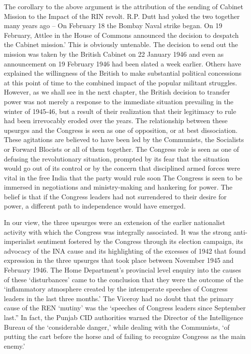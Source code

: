 The corollary to the above argument is the attribution of the sending of Cabinet Mission to the Impact of the RIN revolt. R.P. Dutt had yoked the two together many years ago – On February 18 the Bombay Naval strike began. On 19 February, Attlee in the House of Commons announced the decision to despatch the Cabinet mission.’ This is obviously untenable. The decision to send out the mission was taken by the British Cabinet on 22 January 1946 and even as announcement on 19 February 1946 had been slated a week earlier. Others have explained the willingness of the British to make substantial political concessions at this point of time to the combined impact of the popular militant struggles. However, as we shall see in the next chapter, the British decision to transfer power was not merely a response to the immediate situation prevailing in the winter of 1945-46, but a result of their realization that their legitimacy to rule had been irrevocably eroded over the years. The relationship between these upsurges and the Congress is seen as one of opposition, or at best dissociation. These agitations are believed to have been led by the Communists, the Socialists or Forward Blocists or all of them together. The Congress role is seen as one of defusing the revolutionary situation, prompted by its fear that the situation would go out of its control or by the concern that disciplined armed forces were vital in the free India that the party would rule soon The Congress is seen to be immersed in negotiations and ministry-making and hankering for power. The belief is that if the Congress leaders had not surrendered to their desire for power, a different path to independence would have emerged. 

In our view, the three upsurges were an extension of the earlier nationalist activity with which the Congress was integrally associated. It was the strong anti-imperialist sentiment fostered by the Congress through its election campaign, its advocacy of the INA cause and its highlighting of the excesses of 1942 that found expression in the three upsurges that took place between November 1945 and February 1946. The Home Department’s provincial level enquiry into the causes of these ‘disturbances’ came to the conclusion that they were the outcome of the ‘inflammatory atmosphere created by the intemperate speeches of Congress leaders in the last three months.’ The Viceroy had no doubt that the primary cause of the REN ‘mutiny’ was the ‘speeches of Congress leaders since September last.” In fact, the Punjab CID authorities warned the Director of the Intelligence Bureau of the ‘considerable danger,’ while dealing with the Communists, ‘of putting the cart before the horse and of failing to recognize Congress as the main enemy.’ 


